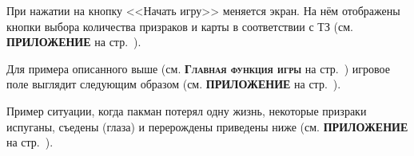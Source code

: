 При нажатии на кнопку <<Начать игру>> меняется экран. На нём отображены кнопки выбора количества призраков и карты в соответствии с ТЗ (см. \textbf{\textsc{ПРИЛОЖЕНИЕ}} на стр.~\pageref{fig4}).

Для примера описанного выше (см. \textbf{\textsc{Главная функция игры}} на стр.~\pageref{sec:ch02/sec01/sub07}) игровое поле выглядит следующим образом (см. \textbf{\textsc{ПРИЛОЖЕНИЕ}} на стр.~\pageref{fig5}).

Пример ситуации, когда пакман потерял одну жизнь, некоторые призраки испуганы, съедены (глаза) и перерождены приведены ниже (см. \textbf{\textsc{ПРИЛОЖЕНИЕ}} на стр.~\pageref{fig6}).